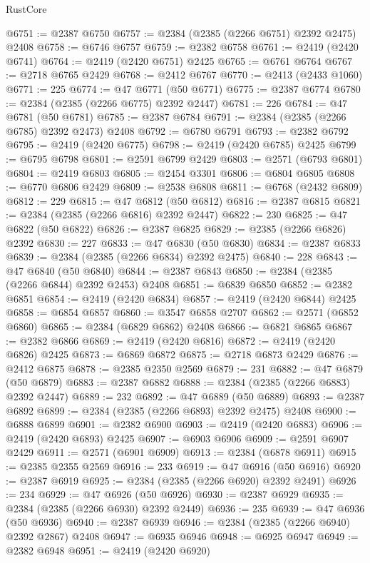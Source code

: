 \begin{lexlean}{RustCore}
\begin{coremodule}
@6751 := @2387 @6750
@6757 := @2384 (@2385 (@2266 @6751) @2392 @2475) @2408
@6758 := @6746 @6757
@6759 := @2382 @6758
@6761 := @2419 (@2420 @6741)
@6764 := @2419 (@2420 @6751) @2425
@6765 := @6761 @6764
@6767 := @2718 @6765 @2429
@6768 := @2412 @6767
@6770 := @2413 (@2433 @1060)
@6771 := 225
@6774 := @47 @6771 (@50 @6771)
@6775 := @2387 @6774
@6780 := @2384 (@2385 (@2266 @6775) @2392 @2447)
@6781 := 226
@6784 := @47 @6781 (@50 @6781)
@6785 := @2387 @6784
@6791 := @2384 (@2385 (@2266 @6785) @2392 @2473) @2408
@6792 := @6780 @6791
@6793 := @2382 @6792
@6795 := @2419 (@2420 @6775)
@6798 := @2419 (@2420 @6785) @2425
@6799 := @6795 @6798
@6801 := @2591 @6799 @2429
@6803 := @2571 (@6793 @6801)
@6804 := @2419 @6803
@6805 := @2454 @3301
@6806 := @6804 @6805
@6808 := @6770 @6806 @2429
@6809 := @2538 @6808
@6811 := @6768 (@2432 @6809)
@6812 := 229
@6815 := @47 @6812 (@50 @6812)
@6816 := @2387 @6815
@6821 := @2384 (@2385 (@2266 @6816) @2392 @2447)
@6822 := 230
@6825 := @47 @6822 (@50 @6822)
@6826 := @2387 @6825
@6829 := @2385 (@2266 @6826) @2392
@6830 := 227
@6833 := @47 @6830 (@50 @6830)
@6834 := @2387 @6833
@6839 := @2384 (@2385 (@2266 @6834) @2392 @2475)
@6840 := 228
@6843 := @47 @6840 (@50 @6840)
@6844 := @2387 @6843
@6850 := @2384 (@2385 (@2266 @6844) @2392 @2453) @2408
@6851 := @6839 @6850
@6852 := @2382 @6851
@6854 := @2419 (@2420 @6834)
@6857 := @2419 (@2420 @6844) @2425
@6858 := @6854 @6857
@6860 := @3547 @6858 @2707
@6862 := @2571 (@6852 @6860)
@6865 := @2384 (@6829 @6862) @2408
@6866 := @6821 @6865
@6867 := @2382 @6866
@6869 := @2419 (@2420 @6816)
@6872 := @2419 (@2420 @6826) @2425
@6873 := @6869 @6872
@6875 := @2718 @6873 @2429
@6876 := @2412 @6875
@6878 := @2385 @2350 @2569
@6879 := 231
@6882 := @47 @6879 (@50 @6879)
@6883 := @2387 @6882
@6888 := @2384 (@2385 (@2266 @6883) @2392 @2447)
@6889 := 232
@6892 := @47 @6889 (@50 @6889)
@6893 := @2387 @6892
@6899 := @2384 (@2385 (@2266 @6893) @2392 @2475) @2408
@6900 := @6888 @6899
@6901 := @2382 @6900
@6903 := @2419 (@2420 @6883)
@6906 := @2419 (@2420 @6893) @2425
@6907 := @6903 @6906
@6909 := @2591 @6907 @2429
@6911 := @2571 (@6901 @6909)
@6913 := @2384 (@6878 @6911)
@6915 := @2385 @2355 @2569
@6916 := 233
@6919 := @47 @6916 (@50 @6916)
@6920 := @2387 @6919
@6925 := @2384 (@2385 (@2266 @6920) @2392 @2491)
@6926 := 234
@6929 := @47 @6926 (@50 @6926)
@6930 := @2387 @6929
@6935 := @2384 (@2385 (@2266 @6930) @2392 @2449)
@6936 := 235
@6939 := @47 @6936 (@50 @6936)
@6940 := @2387 @6939
@6946 := @2384 (@2385 (@2266 @6940) @2392 @2867) @2408
@6947 := @6935 @6946
@6948 := @6925 @6947
@6949 := @2382 @6948
@6951 := @2419 (@2420 @6920)

\end{coremodule}
\end{lexlean}
